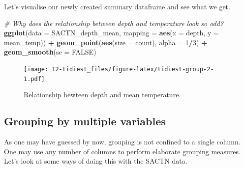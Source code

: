 \documentclass[]{book}
\newenvironment{Shaded}{\begin{snugshade}}{\end{snugshade}}
\newcommand{\KeywordTok}[1]{\textcolor[rgb]{0.13,0.29,0.53}{\textbf{#1}}}
\newcommand{\DataTypeTok}[1]{\textcolor[rgb]{0.13,0.29,0.53}{#1}}
\newcommand{\DecValTok}[1]{\textcolor[rgb]{0.00,0.00,0.81}{#1}}
\newcommand{\StringTok}[1]{\textcolor[rgb]{0.31,0.60,0.02}{#1}}
\newcommand{\CommentTok}[1]{\textcolor[rgb]{0.56,0.35,0.01}{\textit{#1}}}
\newcommand{\OtherTok}[1]{\textcolor[rgb]{0.56,0.35,0.01}{#1}}
\newcommand{\OperatorTok}[1]{\textcolor[rgb]{0.81,0.36,0.00}{\textbf{#1}}}
\newcommand{\NormalTok}[1]{#1}
\theoremstyle{definition}
\theoremstyle{definition}
\theoremstyle{definition}
\theoremstyle{remark}
\begin{document}
Let's visualise our newly created summary dataframe and see what we get.

\begin{Shaded}
\begin{Highlighting}[]
\CommentTok{# Why does the relationship between depth and temperature look so odd?}
\KeywordTok{ggplot}\NormalTok{(}\DataTypeTok{data =}\NormalTok{ SACTN_depth_mean, }\DataTypeTok{mapping =} \KeywordTok{aes}\NormalTok{(}\DataTypeTok{x =}\NormalTok{ depth, }\DataTypeTok{y =}\NormalTok{ mean_temp)) }\OperatorTok{+}
\StringTok{  }\KeywordTok{geom_point}\NormalTok{(}\KeywordTok{aes}\NormalTok{(}\DataTypeTok{size =}\NormalTok{ count), }\DataTypeTok{alpha =} \DecValTok{1}\OperatorTok{/}\DecValTok{3}\NormalTok{) }\OperatorTok{+}
\StringTok{  }\KeywordTok{geom_smooth}\NormalTok{(}\DataTypeTok{se =} \OtherTok{FALSE}\NormalTok{)}
\end{Highlighting}
\end{Shaded}

\begin{figure}
\centering
\texttt{[image: 12-tidiest\_files/figure-latex/tidiest-group-2-1.pdf]}
\caption{\label{fig:tidiest-group-2}Relationship bewteen depth and mean
temperature.}
\end{figure}

\subsection{Grouping by multiple
variables}\label{grouping-by-multiple-variables}

As one may have guessed by now, grouping is not confined to a single
column. One may use any number of columns to perform elaborate grouping
measures. Let's look at some ways of doing this with the SACTN data.

\begin{Shaded}
\end{Shaded}
\end{document}
